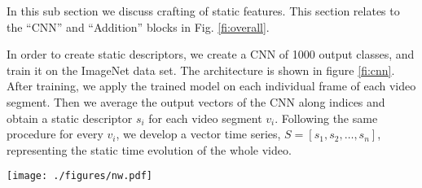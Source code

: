 In this sub section we discuss crafting of static features. This section relates to
the ``CNN'' and ``Addition'' blocks in Fig. \ref{fi:overall}.

In order to create static descriptors, we create a CNN of 1000 output classes, and train it on the ImageNet data set. The architecture is shown in figure \ref{fi:cnn}.
After training, we apply the trained model on each individual frame of each video segment. Then we average the output vectors of the CNN
along indices and obtain a static descriptor $s_{i}$ for each video segment $v_{i}$. Following the same
procedure for every $v_{i}$, we develop a vector time series,
$S =[s_{1}, s_{2}, \dots, s_{n}]$, representing the static time evolution of the whole video.

\begin{figure*}
  \centering
  \texttt{[image: ./figures/nw.pdf]}
  \caption{CNN architecture used for generating static features. The CNN consists of five convolution layers,
  two fully connected layers, and one softmax layer. The details of each convolutional layer are provided on top of each layer
  according to the following format:(number of convolution layers $\times$ filter width $\times$ filter height, convolution stride,
  spatial padding, is Local Response Normalization added, max-pooling factor). Value above fully connected layers indicates the dimensionality of the layer.
  We use \hl{ReLu} as the activation function.}
\label{fi:cnn}
\end{figure*} 
